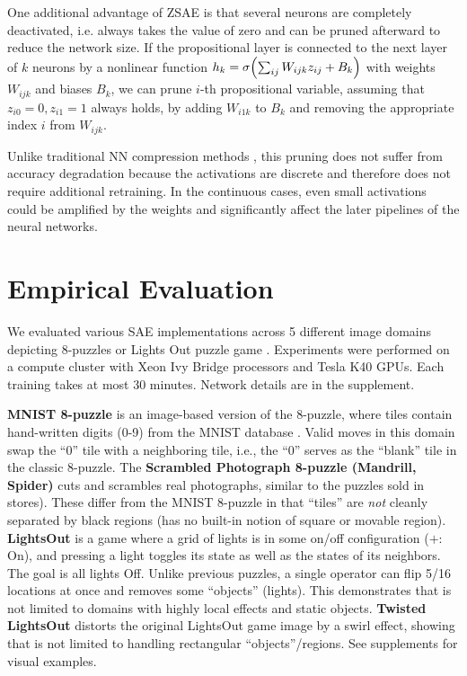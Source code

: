 One additional advantage of ZSAE is that
several neurons are completely deactivated, i.e. always takes the value of zero
and can be pruned afterward to reduce the network size.
If the propositional layer is connected to the next layer of $k$ neurons
by a nonlinear function $h_k=\sigma{\left(\sum_{ij} W_{ijk}z_{ij}+B_k\right)}$
with weights $W_{ijk}$ and biases $B_k$,
we can prune $i$-th propositional variable, assuming that $z_{i0}=0, z_{i1}=1$ always holds,
by adding $W_{i1k}$ to $B_k$ and removing the appropriate index $i$ from $W_{ijk}$.

Unlike traditional NN compression methods \cite{cheng2017survey}, this pruning does not suffer from
accuracy degradation because the activations are discrete and therefore does not require additional retraining.
In the continuous cases, even small activations could be amplified by the weights and significantly affect the
later pipelines of the neural networks.

\section{Empirical Evaluation}
\label{evaluation}

We evaluated various SAE implementations across 5 different
image domains depicting 8-puzzles or Lights Out puzzle game \cite{lightsout}.
Experiments were performed on a compute cluster with Xeon Ivy Bridge
processors and Tesla K40 GPUs.  Each training takes at most 30 minutes.
Network details are in the supplement.

\textbf{MNIST 8-puzzle}
is an image-based version of the 8-puzzle, where tiles contain hand-written digits (0-9) from the  MNIST database \cite{lecun1998gradient}.
Valid moves in this domain swap the ``0'' tile  with a neighboring tile, i.e., the ``0'' serves as the ``blank'' tile in the classic 8-puzzle. 
The \textbf{Scrambled Photograph 8-puzzle (Mandrill, Spider)} cuts and scrambles real photographs, similar to the puzzles sold in stores).
These differ from the MNIST 8-puzzle in that ``tiles'' are \textit{not} cleanly separated by black regions
(\latentplanner has no built-in notion of square or movable region).
\textbf{LightsOut} is
a game where a grid of lights is in some on/off configuration ($+$: On),
and pressing a light toggles its state as well as the states of its neighbors.
The goal is all lights Off.
Unlike previous puzzles, a single operator can flip 5/16 locations at once and
removes some ``objects'' (lights).
This demonstrates that \latentplanner is not limited to domains with highly local effects and static objects.
\textbf{Twisted LightsOut} distorts the original LightsOut game image by a swirl effect,
showing that \latentplanner is not limited to handling rectangular ``objects''/regions.
See supplements for visual examples.

